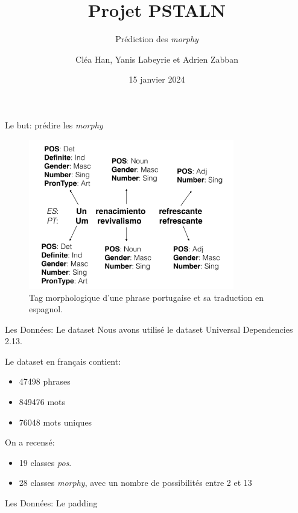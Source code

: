 \documentclass[11pt]{beamer}
\title{Projet PSTALN}
\subtitle{Prédiction des \textit{morphy}}
\author{Cléa Han, Yanis Labeyrie et Adrien Zabban}
\date{15 janvier 2024}
\begin{document}
\maketitle

\begin{frame}{Le but: prédire les \textit{morphy}}
    \begin{figure}[b]
        \centering
        \includegraphics[width=0.8\textwidth]{morphy.png}
        \caption{Tag morphologique d'une phrase portugaise et sa traduction en espagnol.}
    \end{figure}
\end{frame}

\begin{frame}{Les Données: Le dataset}
    Nous avons utilisé le dataset Universal Dependencies 2.13.

    Le dataset en français contient:
    \begin{itemize}
        \item 47498 phrases
        \item 849476 mots
        \item 76048 mots uniques
    \end{itemize}

    On a recensé:
    \begin{itemize}
        \item 19 classes \textit{pos}.
        \item 28 classes \textit{morphy}, avec un nombre de possibilités entre 2 et 13
    \end{itemize}
\end{frame}

\begin{frame}{Les Données: Le padding}

\end{frame}
\end{document}
